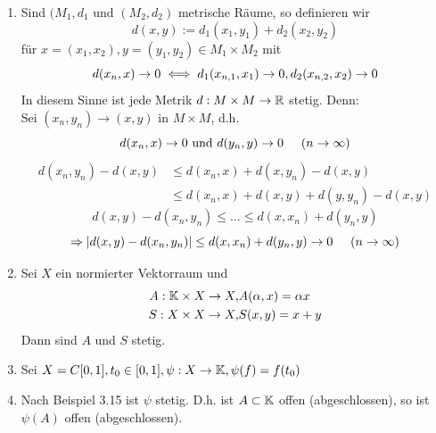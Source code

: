 \begin{beispiel}
	\begin{enumerate}[label=\alph*\upshape)]
		\item Sind $(M_{1}, d_{1}$ und $(M_{2}, d_{2})$ metrische Räume, so definieren wir
			\[ d(x, y) := d_{1}(x_{1}, y_{1}) + d_{2}(x_{2}, y_{2}) \]
			für $x = (x_{1}, x_{2}), y = (y_{1}, y_{2}) \in M_{1} \times M_{2}$ mit
			\[ d(x_{n}, x) \rightarrow 0 \iff d_{1}(x_{n,1}, x_{1}) \rightarrow 0, d_{2}(x_{n,2}, x_{2}) \rightarrow 0 \]
			In diesem Sinne ist jede Metrik $d: M \times M \rightarrow \mathbb{R}$ stetig. Denn: \\
			Sei $(x_{n}, y_{n}) \rightarrow (x, y)$ in $M \times M$, d.h.
			\[ d(x_{n}, x) \rightarrow 0 \text{ und } d(y_{n}, y) \rightarrow 0 \hspace{0.5cm} (n \rightarrow \infty) \]
			\begin{align*}
				 d(x_{n}, y_{n}) - d(x, y) & \leq d(x_{n}, x) + d(x, y_{n}) - d(x, y) \\
										  & \leq d(x_{n}, x) + d(x, y) + d(y, y_{n}) - d(x, y) 		
			\end{align*}
			\[ d(x, y)- d(x_{n}, y_{n}) \leq \dotsc \leq d(x, x_{n}) + d(y_{n}, y) \]
			\[ \Rightarrow | d(x, y) - d(x_{n}, y_{n}) | \leq d(x, x_{n}) + d(y_{n}, y) \rightarrow 0 \hspace{0.5cm} (n \rightarrow \infty) \]
		\item Sei $X$ ein normierter Vektorraum und
			\begin{align*}
				A: \mathbb{K} \times X \rightarrow X, & A( \alpha, x) = \alpha x \\
				S: X \times X \rightarrow X, & S(x, y) = x + y
			\end{align*}
			Dann sind $A$ und $S$ stetig.
		\item Sei $X = C[0, 1], t_{0} \in [0, 1], \psi : X \rightarrow \mathbb{K}, \psi(f) = f(t_{0})$ \\
		\item Nach Beispiel 3.15 ist $\psi$ stetig. D.h. ist $A \subset \mathbb{K}$ offen (abgeschlossen), so ist $\psi(A)$ offen (abgeschlossen).
	\end{enumerate}	
\end{beispiel}

































